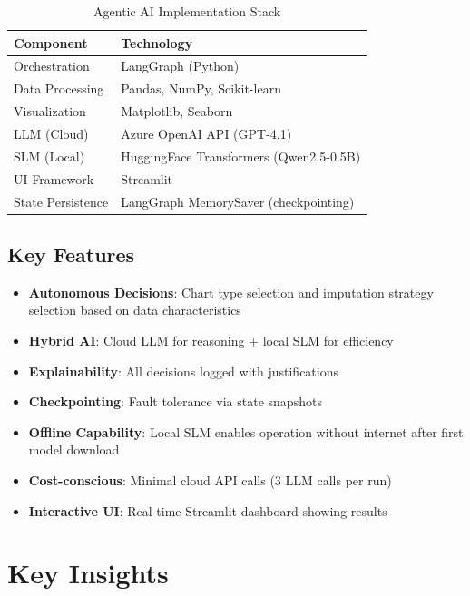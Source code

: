 \documentclass[10pt,a4paper]{article}
\begin{document}
\begin{table}[h]
    \centering
    \caption{Agentic AI Implementation Stack}
    \begin{tabular}{|l|l|}
        \hline
        \textbf{Component} & \textbf{Technology} \\
        \hline
        Orchestration & LangGraph (Python) \\
        Data Processing & Pandas, NumPy, Scikit-learn \\
        Visualization & Matplotlib, Seaborn \\
        LLM (Cloud) & Azure OpenAI API (GPT-4.1) \\
        SLM (Local) & HuggingFace Transformers (Qwen2.5-0.5B) \\
        UI Framework & Streamlit \\
        State Persistence & LangGraph MemorySaver (checkpointing) \\
        \hline
    \end{tabular}
\end{table}

\subsection{Key Features}

\begin{itemize}
    \item \textbf{Autonomous Decisions}: Chart type selection and imputation strategy selection based on data characteristics
    \item \textbf{Hybrid AI}: Cloud LLM for reasoning + local SLM for efficiency
    \item \textbf{Explainability}: All decisions logged with justifications
    \item \textbf{Checkpointing}: Fault tolerance via state snapshots
    \item \textbf{Offline Capability}: Local SLM enables operation without internet after first model download
    \item \textbf{Cost-conscious}: Minimal cloud API calls (3 LLM calls per run)
    \item \textbf{Interactive UI}: Real-time Streamlit dashboard showing results
\end{itemize}
\newpage

\section{Key Insights}
\end{document}
